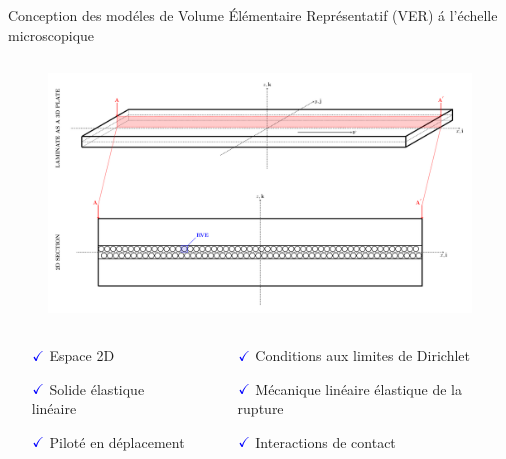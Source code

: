 \documentclass[final]{beamer}
\begin{document}
\begin{frame}
\begin{center}
\begin{minipage}{\textwidth}
\begin{exampleblock}{\rule[-0.6ex]{0pt}{50pt}\centering\LARGE Conception des mod\'eles de Volume \'El\'ementaire Repr\'esentatif (VER) \'a l'\'echelle microscopique}
\begin{columns}
\begin{column}{0.3\textwidth}
\begin{center}
\begin{figure}[!h]
\centering
   \includegraphics[width=\columnwidth]{laminate-section.pdf}
\end{figure}
\begin{columns}
\begin{column}{0.4\columnwidth}
\begin{itemize}
\small
\item[$\color{blue}\checkmark$]Espace 2D
\item[$\color{blue}\checkmark$]Solide \'elastique lin\'eaire
\item[$\color{blue}\checkmark$]Pilot\'e en d\'eplacement
\end{itemize}
\end{column}
\begin{column}{0.6\columnwidth}
\begin{itemize}
\small
\item[$\color{blue}\checkmark$]Conditions aux limites de Dirichlet
\item[$\color{blue}\checkmark$]M\'ecanique lin\'eaire \'elastique de la rupture
\item[$\color{blue}\checkmark$]Interactions de contact
\end{itemize}
\end{column}
\end{columns}

\end{center}
\end{column}
\end{columns}
\end{exampleblock}
\end{minipage}
\end{center}
\end{frame}
\end{document}
